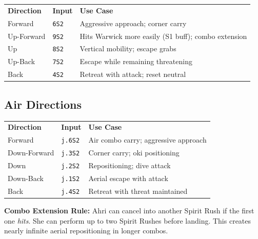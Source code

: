 \documentclass[12pt, a4paper]{report}
\newcommand{\notation}[1]{{\small\texttt{\textcolor{ahriCyan}{#1}}}}
\begin{document}
\begin{center}
\begin{tabular}{L{3.5cm} L{3.5cm} L{6cm}}
\textcolor{ahriCyan}{\textbf{Direction}} & \textcolor{ahriCyan}{\textbf{Input}} & \textcolor{ahriCyan}{\textbf{Use Case}} \\
Forward & \notation{6S2} & Aggressive approach; corner carry \\
Up-Forward & \notation{9S2} & Hits Warwick more easily (S1 buff); combo extension \\
Up & \notation{8S2} & Vertical mobility; escape grabs \\
Up-Back & \notation{7S2} & Escape while remaining threatening \\
Back & \notation{4S2} & Retreat with attack; reset neutral \\
\end{tabular}
\end{center}

\subsection{Air Directions}

\begin{center}
\begin{tabular}{L{3.5cm} L{3.5cm} L{6cm}}
\textcolor{ahriCyan}{\textbf{Direction}} & \textcolor{ahriCyan}{\textbf{Input}} & \textcolor{ahriCyan}{\textbf{Use Case}} \\
Forward & \notation{j.6S2} & Air combo carry; aggressive approach \\
Down-Forward & \notation{j.3S2} & Corner carry; oki positioning \\
Down & \notation{j.2S2} & Repositioning; dive attack \\
Down-Back & \notation{j.1S2} & Aerial escape with attack \\
Back & \notation{j.4S2} & Retreat with threat maintained \\
\end{tabular}
\end{center}

\begin{tipbox}
\textbf{Combo Extension Rule:} Ahri can cancel into another Spirit Rush if the first one \textit{hits}. She can perform up to two Spirit Rushes before landing. This creates nearly infinite aerial repositioning in longer combos.
\end{tipbox}
\end{document}
